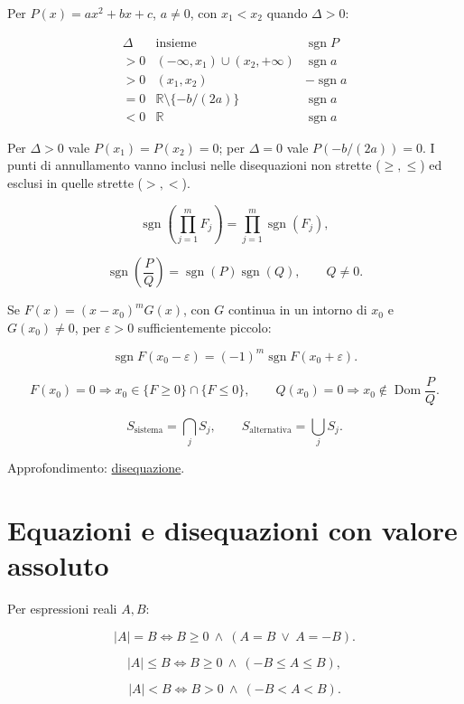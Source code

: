 Per \(P(x)=ax^2+bx+c\), \(a\ne0\), con \(x_1<x_2\) quando \(\Delta>0\):

\[
\begin{array}{c|c|c}
\Delta&\text{insieme}&\operatorname{sgn}P\\
\hline
>0&(-\infty,x_1)\cup(x_2,+\infty)&\operatorname{sgn}a\\
>0&(x_1,x_2)&-\operatorname{sgn}a\\
=0&\mathbb R\setminus\{-b/(2a)\}&\operatorname{sgn}a\\
<0&\mathbb R&\operatorname{sgn}a
\end{array}
\]

Per \(\Delta>0\) vale \(P(x_1)=P(x_2)=0\); per \(\Delta=0\) vale \(P(-b/(2a))=0\). I punti di annullamento vanno inclusi nelle disequazioni non strette (\(\ge,\le\)) ed esclusi in quelle strette (\(>,<\)).

\[
\operatorname{sgn}\!\left(\prod_{j=1}^m F_j\right)
=\prod_{j=1}^m\operatorname{sgn}(F_j),
\]

\[
\operatorname{sgn}\!\left(\frac PQ\right)
=\operatorname{sgn}(P)\operatorname{sgn}(Q),
\qquad Q\ne0.
\]

Se \(F(x)=(x-x_0)^mG(x)\), con \(G\) continua in un intorno di \(x_0\) e \(G(x_0)\ne0\), per \(\varepsilon>0\) sufficientemente piccolo:

\[
\operatorname{sgn}F(x_0-\varepsilon)
=(-1)^m\operatorname{sgn}F(x_0+\varepsilon).
\]

\[
F(x_0)=0
\Longrightarrow
x_0\in\{F\ge0\}\cap\{F\le0\},
\qquad
Q(x_0)=0
\Longrightarrow
x_0\notin\operatorname{Dom}\frac PQ.
\]

\[
S_{\text{sistema}}=\bigcap_j S_j,
\qquad
S_{\text{alternativa}}=\bigcup_j S_j.
\]

Approfondimento: \href{https://ingegnerismo.it/matematica/disequazione/}{disequazione}.

\section{Equazioni e disequazioni con valore assoluto}\label{equazioni-e-disequazioni-con-valore-assoluto}

Per espressioni reali \(A,B\):

\[
|A|=B
\Longleftrightarrow
B\ge0\ \land\ (A=B\ \lor\ A=-B).
\]

\[
|A|\le B
\Longleftrightarrow
B\ge0\ \land\ (-B\le A\le B),
\]

\[
|A|<B
\Longleftrightarrow
B>0\ \land\ (-B<A<B).
\]

